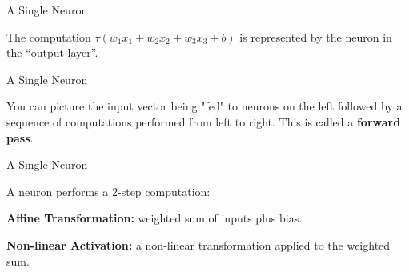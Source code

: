 \documentclass[11pt,compress,t,notes=noshow, xcolor=table]{beamer}
\begin{document}
\begin{framei} {A Single Neuron}
\item The computation $\tau(w_1x_1 + w_2x_2 + w_3x_3 + b)$ is represented by the neuron in the \enquote{output layer}.
\end{framei}

\begin{framei} {A Single Neuron}
\item %
You can picture the input vector being "fed" to neurons on the left followed by a sequence of computations performed from left to right. This is called a \textbf{forward pass}.
\end{framei}

\begin{framei} {A Single Neuron}
\item A neuron performs a 2-step computation:
\item \textbf{Affine Transformation:} weighted sum of inputs plus bias.
\item \textbf{Non-linear Activation:} a non-linear transformation applied to the weighted sum.
\end{framei}

\end{document}
